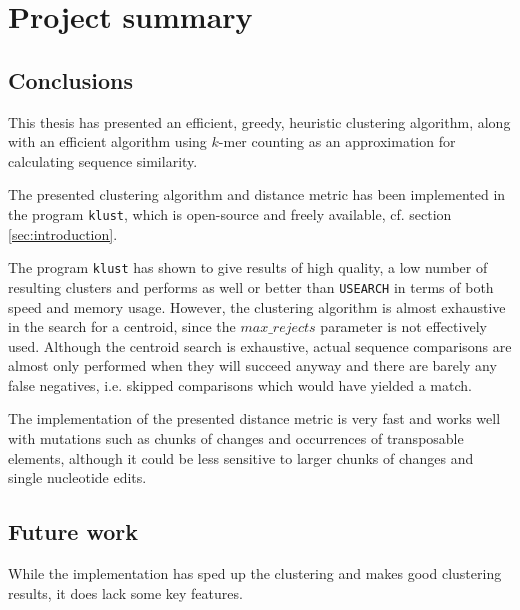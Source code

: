 \section{Project summary}

\subsection{Conclusions}
\label{sec:conclusions}

This thesis has presented an efficient, greedy, heuristic clustering algorithm,
along with an efficient algorithm using $k$-mer counting as an approximation
for calculating sequence similarity.

The presented clustering algorithm and distance metric has been implemented in
the program \texttt{klust}, which is open-source and freely available, cf.
section \ref{sec:introduction}.

The program \texttt{klust} has shown to give results of high quality, a low
number of resulting clusters and performs as well or better than
\texttt{USEARCH} in terms of both speed and memory usage. However, the
clustering algorithm is almost exhaustive in the search for a centroid, since
the $max\_rejects$ parameter is not effectively used. Although the centroid
search is exhaustive, actual sequence comparisons are almost only performed
when they will succeed anyway and there are barely any false negatives, i.e.
skipped comparisons which would have yielded a match.

The implementation of the presented distance metric is very fast and works well
with mutations such as chunks of changes and occurrences of transposable
elements, although it could be less sensitive to larger chunks of changes and
single nucleotide edits.


\subsection{Future work}
\label{sec:future_work}

While the implementation has sped up the clustering and makes good clustering
results, it does lack some key features.

